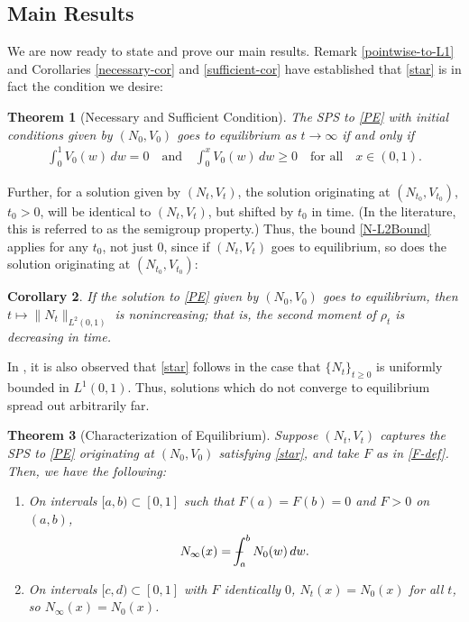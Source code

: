 \documentclass[10pt,a4paper]{amsart}
\newtheorem{thm}{Theorem}[section]
\newtheorem{cor}[thm]{Corollary}
\numberwithin{equation}{section}
\def\Xint#1{\mathchoice
{\XXint\displaystyle\textstyle{#1}}%
{\XXint\textstyle\scriptstyle{#1}}%
{\XXint\scriptstyle\scriptscriptstyle{#1}}%
{\XXint\scriptscriptstyle\scriptscriptstyle{#1}}%
   \!\int}
\def\XXint#1#2#3{{\setbox0=\hbox{$#1{#2#3}{\int}$}
\vcenter{\hbox{$#2#3$}}\kern-.5\wd0}}
\def\dashint{\Xint-}
\begin{document}
\subsection{Main Results}
    We are now ready to state and prove our main results. Remark \ref{pointwise-to-L1} and Corollaries \ref{necessary-cor} and \ref{sufficient-cor} have established that \eqref{star} is in fact the condition we desire: 
    \begin{thm}[Necessary and Sufficient Condition]\label{necessary-and-sufficient}
        The SPS to \eqref{PE}  with initial conditions given by $(N_0, V_0)$ goes to equilibrium as $t\to\infty$ if and only if
        \begin{align*}\label{star2}\tag{$\bigstar$}
            \int_0^1 V_0(w) \, dw=0 \quad\text{and}\quad \int_0^x V_0(w) \, dw\geq0 \quad\text{for all}\quad x\in(0,1). 
        \end{align*}        
    \end{thm}
    Further, for a solution given by $(N_t,V_t)$, the solution originating at $(N_{t_0},V_{t_0})$, $t_0>0$, will be identical to $(N_t,V_t)$, but shifted by $t_0$ in time. (In the literature, this is referred to as the semigroup property.) Thus, the bound \eqref{N-L2Bound} applies for any $t_0$, not just $0$, since if $(N_t,V_t)$ goes to equilibrium, so does the solution originating at $(N_{t_0},V_{t_0})$:
    \begin{cor}
        If the solution to \eqref{PE} given by $(N_0,V_0)$ goes to equilibrium, then $t\mapsto\|N_t\|_{L^2(0,1)}$ is nonincreasing; that is, the second moment of $\rho_t$ is decreasing in time. 
    \end{cor}
    In \cite{Hynd-Tudorascu}, it is also observed that \eqref{star} follows in the case that $\{N_t\}_{t\geq0}$ is uniformly bounded in $L^1(0,1)$. Thus, solutions which do not converge to equilibrium spread out arbitrarily far. 


\begin{thm}[Characterization of Equilibrium]\label{characterization-of-equilibrium}
    Suppose $(N_t,V_t)$ captures the SPS to \eqref{PE} originating at $(N_0,V_0)$ satisfying \eqref{star}, and take $F$ as in \eqref{F-def}. Then, we have the following:
    \begin{enumerate}
        \item On intervals $[a,b)\subset[0,1]$ such that $F(a)=F(b)=0$ and $F>0$ on $(a,b)$, 
        \begin{align*}
            N_\infty(x)=\dashint_a^b N_0(w) \, dw. 
        \end{align*}
        \item On intervals $[c,d)\subset[0,1]$ with $F$ identically $0$, $N_t(x)=N_0(x)$ for all $t$, so $N_\infty(x)=N_0(x)$.
    \end{enumerate}
     
\end{thm}
\end{document}
